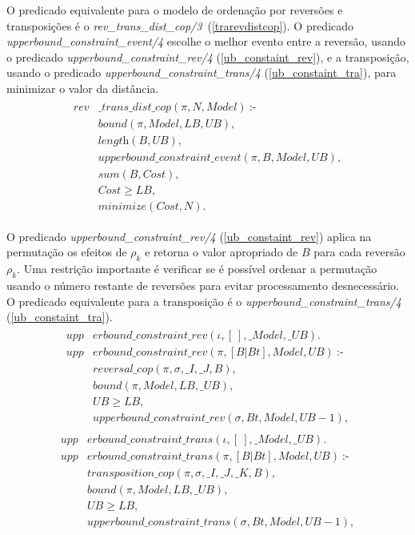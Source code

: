 O predicado equivalente para o modelo de ordenação por reversões e
transposições é
o \textit{rev\_trans\_dist\_cop/3}~(\ref{trarevdistcop}). O
predicado \textit{upperbound\_constraint\_event/4} escolhe o melhor
evento entre a reversão, usando o
predicado \textit{upperbound\_constraint\_rev/4}
(\ref{ub_constaint_rev}), e a transposição, usando o
predicado \textit{upperbound\_constraint\_trans/4}
(\ref{ub_constaint_tra}), para minimizar o valor da distância.
\begin{align}
  \label{trarevdistcop}
  \begin{split}
  \textit{rev}&\textit{\_trans\_dist\_cop}(\pi, N, Model)~\text{:-} \\
  &\textit{bound}(\pi, Model, LB, UB), \\
  &\textit{length}(B, UB),  \\
  &\textit{upperbound\_constraint\_event}(\pi, B, Model, UB), \\
  &\textit{sum}(B, Cost),  \\
  &\textit{Cost} \ge \textit{LB},  \\
  &\textit{minimize}(Cost, N). 
  \end{split}
\end{align}

O predicado \textit{upperbound\_constraint\_rev/4}
(\ref{ub_constaint_rev}) aplica na permutação os efeitos de $\rho_{k}$
e retorna o valor apropriado de $B$ para cada reversão $\rho_{k}$. Uma
restrição importante é verificar se é possível ordenar a permutação
usando o número restante de reversões para evitar processamento
desnecessário. O predicado equivalente para a transposição é o
\textit{upperbound\_constraint\_trans/4} (\ref{ub_constaint_tra}).
\begin{align}
  \label{ub_constaint_rev}
  \begin{split}
  \textit{upp}&\textit{erbound\_constraint\_rev}(\iota, [~], \_Model, \_UB). \\
  \textit{upp}&\textit{erbound\_constraint\_rev}(\pi, [B|Bt], Model, UB)~\text{:-} \\
  &\textit{reversal\_cop}(\pi, \sigma, \_I, \_J, B), \\
  &\textit{bound}(\pi, Model, LB, \_UB), \\
  &UB \ge LB,  \\
  &\textit{upperbound\_constraint\_rev}(\sigma, Bt, Model, UB - 1),  
  \end{split}
\end{align}
\begin{align}
  \label{ub_constaint_tra}
  \begin{split}
  \textit{upp}&\textit{erbound\_constraint\_trans}(\iota, [~], \_Model, \_UB). \\
  \textit{upp}&\textit{erbound\_constraint\_trans}(\pi, [B|Bt], Model, UB)~\text{:-} \\
  &\textit{transposition\_cop}(\pi, \sigma, \_I, \_J, \_K, B), \\
  &\textit{bound}(\pi, Model, LB, \_UB), \\
  &UB \ge LB,  \\
  &\textit{upperbound\_constraint\_trans}(\sigma, Bt, Model, UB - 1),  
  \end{split}
\end{align}

